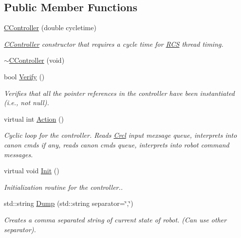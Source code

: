 \subsection*{Public Member Functions}
\begin{DoxyCompactItemize}
\item 
\hyperlink{structRCS_1_1CController_acf0744408b45b6d9f60cb44c9d64f1a8}{C\-Controller} (double cycletime)
\begin{DoxyCompactList}\small\item\em \hyperlink{structRCS_1_1CController}{C\-Controller} constructor that requires a cycle time for \hyperlink{namespaceRCS}{R\-C\-S} thread timing. \end{DoxyCompactList}\item 
\hyperlink{structRCS_1_1CController_a2bfe656f4d6a26d3dc4556ed8dab118a}{$\sim$\-C\-Controller} (void)
\item 
bool \hyperlink{structRCS_1_1CController_a7f04bc3e6f36033b2ea18bbac9c34a64}{Verify} ()
\begin{DoxyCompactList}\small\item\em Verifies that all the pointer references in the controller have been instantiated (i.\-e., not null). \end{DoxyCompactList}\item 
virtual int \hyperlink{structRCS_1_1CController_a0ca284e0879e57399044e6700630a526}{Action} ()
\begin{DoxyCompactList}\small\item\em Cyclic loop for the controller. Reads \hyperlink{namespaceCrcl}{Crcl} input mexsage queue, interprets into canon cmds if any, reads canon cmds queue, interprets into robot command messages. \end{DoxyCompactList}\item 
virtual void \hyperlink{structRCS_1_1CController_ad26d222b33f2b043f8a8d8b2b17bac01}{Init} ()
\begin{DoxyCompactList}\small\item\em Initialization routine for the controller.. \end{DoxyCompactList}\item 
std\-::string \hyperlink{structRCS_1_1CController_aa7c4b106c4fb8064d896ccad7ce25b46}{Dump} (std\-::string separator=\char`\"{},\char`\"{})
\begin{DoxyCompactList}\small\item\em Creates a comma separated string of current state of robot. (Can use other separator). \end{DoxyCompactList}\item 

\end{DoxyCompactItemize}
